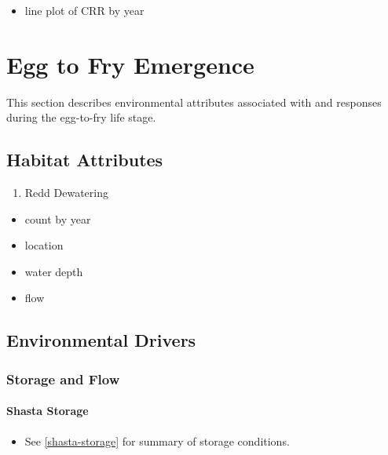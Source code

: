 \documentclass[
]{book}
\providecommand{\tightlist}{%
  \setlength{\itemsep}{0pt}\setlength{\parskip}{0pt}}
\theoremstyle{definition}
\theoremstyle{definition}
\theoremstyle{definition}
\theoremstyle{definition}
\theoremstyle{remark}
\begin{document}
\begin{itemize}
\tightlist
\item
  line plot of CRR by year
\end{itemize}

\hypertarget{egg-to-fry-emergence}{%
\chapter{Egg to Fry Emergence}\label{egg-to-fry-emergence}}

This section describes environmental attributes associated with and responses during the egg-to-fry life stage.

\hypertarget{habitat-attributes-1}{%
\section{Habitat Attributes}\label{habitat-attributes-1}}

\begin{enumerate}
\def\labelenumi{\arabic{enumi}.}
\tightlist
\item
  Redd Dewatering
\end{enumerate}

\begin{itemize}
\tightlist
\item
  count by year
\item
  location
\item
  water depth
\item
  flow
\end{itemize}

\hypertarget{environmental-drivers}{%
\section{Environmental Drivers}\label{environmental-drivers}}

\hypertarget{storage-and-flow-1}{%
\subsection{Storage and Flow}\label{storage-and-flow-1}}

\hypertarget{shasta-storage-1}{%
\subsubsection{Shasta Storage}\label{shasta-storage-1}}

\begin{itemize}
\tightlist
\item
  See \ref{shasta-storage} for summary of storage conditions.
\end{itemize}
\end{document}
